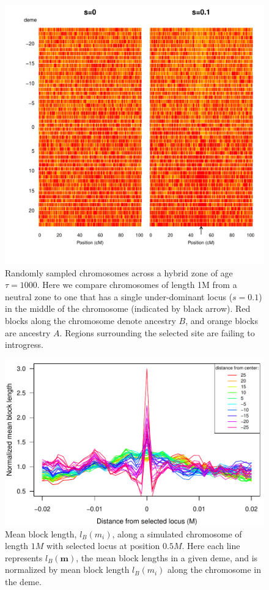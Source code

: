 \documentclass[12pt]{article}
\begin{document}
\begin{figure}
\includegraphics[width=\textwidth]{figs/plot_chromosomes_tau1000}
\caption{Randomly sampled chromosomes  across a hybrid zone of age $\tau=1000$. Here we compare chromosomes of length 1M from a neutral zone to one that has a single under-dominant locus ($s=0.1$) in the middle of the chromosome (indicated by black arrow). Red blocks along the chromosome denote ancestry $B$, and orange blocks are ancestry $A$. Regions surrounding the selected site are failing to introgress.
 }\label{Fig:resistanceToIntrogression1000g}
\end{figure}

\begin{figure}
\includegraphics{figs/blocksAlongChromAncBConditioning}
\caption{Mean block length, $l_B(m_i)$, along a simulated chromosome of length $1M$ with selected locus at position $0.5M$. Here each line represents  $l_B(\mathbf{m})$, the mean block lengths in a given deme, and is normalized by mean block length $l_B(m_i)$ along the chromosome in the deme.}\label{Fig:blockLengths}
\end{figure}
\end{document}
